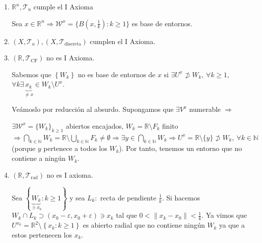 \begin{ej}
\begin{enumerate}
    \item $\mathbb{R}^n, \mathcal{T}_u$ cumple el I Axioma
    \begin{demo}    
        Sea $x \in \mathbb{R}^n \Rightarrow \mathcal{W}^x = \{B\left( x, \frac{1}{k} \right): k \ge 1\}$ es base de entornos.
    \end{demo}
    \item $\left( X, \mathcal{T}_a \right), \left( X, \mathcal{T}_{\text{discreta}} \right)$ cumplen el I Axioma.
    \item $\left( \mathbb{R}, \mathcal{T}_{\text{CF}} \right)$ no es I Axioma.
    \begin{demo}
    Sabemos que $\left\{ W_k \right\}$ no es base de entornos de $x$ si $\exists U^x \not \supset W_k,\ \forall k \ge 1$, $\forall k \exists \underbrace{x_k}_{\neq x} \in W_k \setminus U^x$.

    Veámoslo por reducción al absurdo. Supongamos que $\exists V^x$ numerable $\Rightarrow$

    $\exists \mathcal{W}^x = \{W_k\}_{k \ge 1}$ abiertos encajados, $W_k = \mathbb{R} \setminus F_k$ finito $\Rightarrow \bigcap_{k \in \mathbb{N}} W_k = \mathbb{R} \setminus \bigcup_{k \in \mathbb{N}} F_k \neq \emptyset \Rightarrow \exists y \in \bigcap_{k \in \mathbb{N}} W_k \Rightarrow U^x = \mathbb{R}\setminus \{y\} \not \supset W_k,\ \forall k \in \mathbb{N}$ (porque $y$ pertenece a todos los $W_k$). Por tanto, tenemos un entorno que no contiene a ningún $W_k$.
    \end{demo}

    \item $\left( \mathbb{R}, \mathcal{T}_{\text{rad}} \right)$ no es I axioma.
    \begin{demo}
    Sea $\left\{ \underbrace{W_k}_{\ni x_0} : k \ge 1 \right\}$ y sea $L_k: $ recta de pendiente $\frac{1}{k}$. Si hacemos $W_k \cap L_k \supset \left( x_0 - \varepsilon, x_0 + \varepsilon \right) \ni x_k$ 
    tal que $0 < \lVert x_k - x_0 \rVert < \frac{1}{k}$. Ya vimos que $U^{x_0} = \mathbb{R}^2 \setminus \left\{ x_k: k \ge 1 \right\}$ es abierto radial que 
    no contiene ningún $W_k$ ya que a estos pertenecen los $x_k$.
    \end{demo}
\end{enumerate}
\end{ej}

